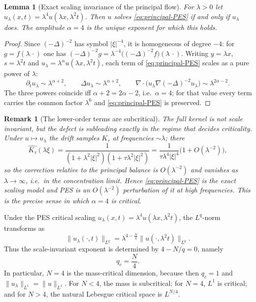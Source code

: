 \documentclass[pdflatex,sn-mathphys-num]{sn-jnl}%
\theoremstyle{thmstyleone}
\newtheorem{lemma}[theorem]{Lemma}
\theoremstyle{thmstyletwo}
\newtheorem{remark}{Remark}
\theoremstyle{thmstylethree}
\begin{document}
\begin{lemma}[Exact scaling invariance of the principal flow]
\label{lem:exact-scaling}
For \(\lambda>0\) let \(u_\lambda(x,t)=\lambda^4u(\lambda x,\lambda^2t)\). Then
\(u\) solves \eqref{eq:principal-PES} if and only if \(u_\lambda\) does. The
amplitude \(\alpha=4\) is the unique exponent for which this holds.
\end{lemma}

\begin{proof}
Since \((-\Delta)^{-2}\) has symbol \(|\xi|^{-4}\), it is homogeneous of degree
\(-4\): for \(g=f(\lambda\,\cdot)\) one has
\((-\Delta)^{-2}g=\lambda^{-4}\bigl((-\Delta)^{-2}f\bigr)(\lambda\,\cdot)\).
Writing \(y=\lambda x\), \(s=\lambda^2t\) and \(u_\lambda=\lambda^\alpha
u(\lambda x,\lambda^2t)\), each term of \eqref{eq:principal-PES} scales as a
pure power of \(\lambda\):
\[
   \partial_t u_\lambda\sim\lambda^{\alpha+2},\qquad
   \Delta u_\lambda\sim\lambda^{\alpha+2},\qquad
   \nabla\!\cdot\!\bigl(u_\lambda\nabla(-\Delta)^{-2}u_\lambda\bigr)
   \sim\lambda^{2\alpha-2}.
\]
The three powers coincide iff \(\alpha+2=2\alpha-2\), i.e.\ \(\alpha=4\); for
that value every term carries the common factor \(\lambda^{6}\) and
\eqref{eq:principal-PES} is preserved.
\end{proof}

\begin{remark}[The lower-order terms are subcritical]
\label{rem:perturbation-subcritical}
The full kernel is not scale invariant, but the defect is subleading exactly in
the regime that decides criticality. Under \(u\mapsto u_\lambda\) the drift
samples \(K_\tau\) at frequencies \(\sim\lambda\); there
\[
   \widehat{K_\tau}(\lambda\xi)
   =\frac{1}{(1+\lambda^2|\xi|^2)(1+\tau\lambda^2|\xi|^2)}
   =\frac{1}{\tau\lambda^4|\xi|^4}\bigl(1+O(\lambda^{-2})\bigr),
\]
so the correction relative to the principal balance is \(O(\lambda^{-2})\) and
vanishes as \(\lambda\to\infty\), i.e.\ in the concentration limit. Hence
\eqref{eq:principal-PES} is the exact scaling model and PES is an
\(O(\lambda^{-2})\) perturbation of it at high frequencies. This is the precise
sense in which \(\alpha=4\) is critical.
\end{remark}

Under the PES critical scaling \(u_\lambda(x,t)=\lambda^4u(\lambda
x,\lambda^2t)\), the \(L^q\)-norm transforms as
\[
        \|u_\lambda(\cdot,t)\|_{L^q}
        =
        \lambda^{4-\frac{N}{q}}
        \|u(\cdot,\lambda^2t)\|_{L^q}.
\]
Thus the scale-invariant exponent is determined by \(4-N/q=0\), namely
\[
        q_c=\frac{N}{4}.
\]
In particular, \(N=4\) is the mass-critical dimension, because then \(q_c=1\)
and \(\|u_\lambda\|_{L^1}=\|u\|_{L^1}\).  For \(N<4\), the mass is subcritical;
for \(N=4\), \(L^1\) is critical; and for \(N>4\), the natural Lebesgue
critical space is \(L^{N/4}\).
\end{document}
